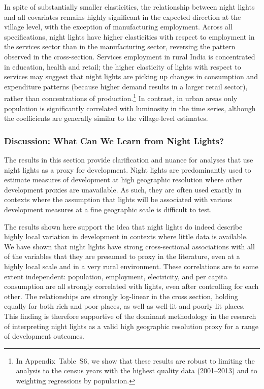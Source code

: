\documentclass[12pt,letterpaper]{article}
\begin{document}
In spite of substantially smaller elasticities, the relationship
between night lights and all covariates remains highly significant in
the expected direction at the village level, with the exception of
manufacturing employment. Across all specifications, night lights have
higher elasticities with respect to employment in the services sector
than in the manufacturing sector, reversing the pattern observed in
the cross-section. Services employment in rural India is concentrated
in education, health and retail; the higher elasticity of lights with
respect to services may suggest that night lights are picking up
changes in consumption and expenditure patterns (because higher demand
results in a larger retail sector), rather than concentrations of
production.\footnote{In Appendix~Table~S6, we show that these results
  are robust to limiting the analysis to the census years with the
  highest quality data (2001--2013) and to weighting regressions by
  population.} In contrast, in urban areas only population is
significantly correlated with luminosity in the time series, although
the coefficients are generally similar to the village-level estimates.

\subsubsection*{Discussion: What Can We Learn from Night Lights?}

The results in this section provide clarification and nuance for
analyses that use night lights as a proxy for development. Night
lights are predominantly used to estimate measures of development at
high geographic resolution where other development proxies are
unavailable. As such, they are often used exactly in contexts where
the assumption that lights will be associated with various development
measures at a fine geographic scale is difficult to test.

The results shown here support the idea that night lights do indeed
describe highly local variation in development in contexts where
little data is available. We have shown that night lights have strong
cross-sectional associations with all of the variables that they are
presumed to proxy in the literature, even at a highly local scale and
in a very rural environment. These correlations are to some extent
independent: population, employment, electricity, and per capita
consumption are all strongly correlated with lights, even after
controlling for each other. The relationships are strongly log-linear
in the cross section, holding equally for both rich and poor places,
as well as well-lit and poorly-lit places. This finding is therefore
supportive of the dominant methodology in the research of interpreting
night lights as a valid high geographic resolution proxy for a range
of development outcomes.
\end{document}
